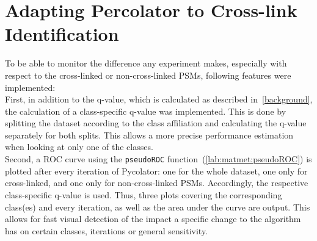 \section{Adapting Percolator to Cross-link Identification}
To be able to monitor the difference any experiment makes, especially with respect to the cross-linked or non-cross-linked PSMs, following features were implemented:\\
First, in addition to the q-value, which is calculated as described in~\ref{background}, the calculation of a class-specific q-value was implemented. This is done by splitting the dataset according to the class affiliation and calculating the q-value separately for both splits. This allows a more precise performance estimation when looking at only one of the classes.\\
\label{lab:matmet:rocs_after_every_iteration}
Second, a ROC curve using the \texttt{pseudoROC} function~(\ref{lab:matmet:pseudoROC}) is plotted after every iteration of Pycolator: one for the whole dataset, one only for cross-linked, and one only for non-cross-linked PSMs. Accordingly, the respective class-specific q-value is used. Thus, three plots covering the corresponding class(es) and every iteration, as well as the area under the curve are output. This allows for fast visual detection of the impact a specific change to the algorithm has on certain classes, iterations or general sensitivity.
